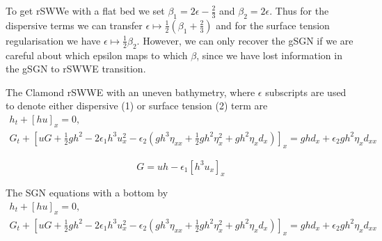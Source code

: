 \documentclass[10pt]{elsarticle}
\begin{document}
To get rSWWe with a flat bed we set $\beta_1 = 2 \epsilon - \frac{2}{3}$ and $\beta_2 = 2 \epsilon$. Thus for the dispersive terms we can transfer $\epsilon \mapsto \frac{1}{2} \left(\beta_1 + \frac{2}{3} \right)$ and for the surface tension regularisation we have  $\epsilon \mapsto \frac{1}{2} \beta_2$. However, we can only recover the gSGN if we are careful about which epsilon maps to which $\beta$, since we have lost information in the gSGN to rSWWE transition.



The Clamond rSWWE with an uneven bathymetry, where $\epsilon$ subscripts are used to denote either dispersive (1) or surface tension (2) term are
\begin{align*}
h_t + \left[hu\right]_x = 0,\\
G_t + \left[uG + \frac{1}{2} gh^2  - 2 \epsilon_1 h^3 u_x^2 - \epsilon_2 \left(gh^3\eta_{xx} + \frac{1}{2} g h^2 \eta_x^2 + g h^2 \eta_x d _ x\right)  \right]_x  = ghd_x + \epsilon_2 g h^2 \eta_x d_{xx}
\end{align*}

\[G = uh - \epsilon_1\left[h^3 u_x\right]_x\]

The SGN equations with a bottom by
\begin{align*}
h_t + \left[hu\right]_x = 0,\\
G_t + \left[uG + \frac{1}{2} gh^2  - 2 \epsilon_1 h^3 u_x^2 - \epsilon_2 \left(gh^3\eta_{xx} + \frac{1}{2} g h^2 \eta_x^2 + g h^2 \eta_x d _ x\right)  \right]_x  = ghd_x + \epsilon_2 g h^2 \eta_x d_{xx}
\end{align*}
\end{document}
